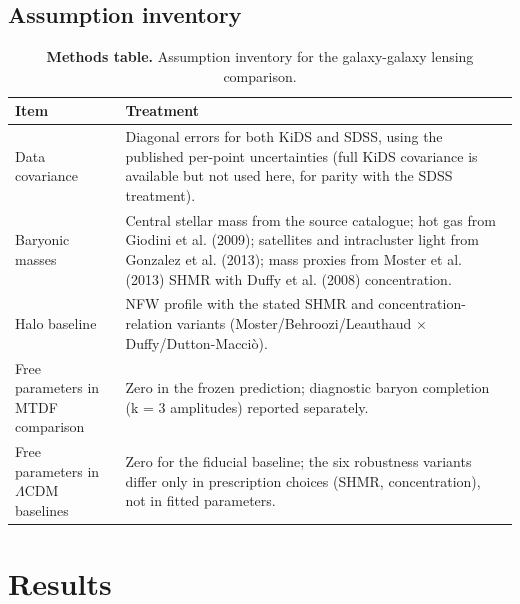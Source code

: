 \documentclass[11pt,a4paper]{article}
\begin{document}
\subsection{Assumption inventory}
\begin{table}[H]
\centering
\footnotesize
\caption{\textbf{Methods table.} Assumption inventory for the galaxy-galaxy lensing comparison.}
\begin{tabularx}{\linewidth}{l>{\RaggedRight\arraybackslash}X}
\toprule
\textbf{Item} & \textbf{Treatment} \tabularnewline
\midrule
Data covariance & Diagonal errors for both KiDS and SDSS, using the published per-point uncertainties (full KiDS covariance is available but not used here, for parity with the SDSS treatment). \tabularnewline
Baryonic masses & Central stellar mass from the source catalogue; hot gas from Giodini et al. (2009); satellites and intracluster light from Gonzalez et al. (2013); mass proxies from Moster et al. (2013) SHMR with Duffy et al. (2008) concentration. \tabularnewline
Halo baseline & NFW profile with the stated SHMR and concentration-relation variants (Moster/\allowbreak{}Behroozi/\allowbreak{}Leauthaud $\times$ Duffy/\allowbreak{}Dutton-Macci\`o). \tabularnewline
Free parameters in MTDF comparison & Zero in the frozen prediction; diagnostic baryon completion (k = 3 amplitudes) reported separately. \tabularnewline
Free parameters in $\Lambda$CDM baselines & Zero for the fiducial baseline; the six robustness variants differ only in prescription choices (SHMR, concentration), not in fitted parameters. \tabularnewline
\bottomrule
\end{tabularx}
\end{table}

\section{Results}
\label{sec:results}
\end{document}
